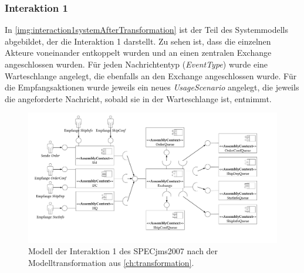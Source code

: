 

\subsubsection{Interaktion 1}
In \autoref{img:interaction1systemAfterTransformation} ist der Teil des Systemmodells abgebildet, der die Interaktion 1 darstellt. Zu sehen ist, dass die einzelnen Akteure voneinander entkoppelt wurden und an einen zentralen Exchange angeschlossen wurden. Für jeden Nachrichtentyp (\emph{EventType}) wurde eine Warteschlange angelegt, die ebenfalls an den Exchange angeschlossen wurde. Für die Empfangsaktionen wurde jeweils ein neues \emph{UsageScenario} angelegt, die jeweils die angeforderte Nachricht, sobald sie in der Warteschlange ist, entnimmt. 
\begin{figure}
\center
  \includegraphics[width=1.4\textwidth,angle=90]{images/evaluation/specjms/evaluationInteraktion1new.pdf}
  \caption{Modell der Interaktion 1 des SPECjms2007 nach der Modelltransformation aus \autoref{ch:transformation}.}
  \label{img:interaction1systemAfterTransformation}
\end{figure}
